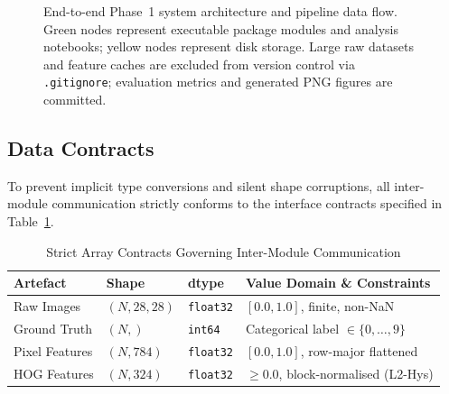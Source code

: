 \documentclass[conference]{IEEEtran}
\newcommand{\code}[1]{\texttt{#1}}
\newcommand{\file}[1]{\texttt{#1}}
\begin{document}
\begin{figure}[!t]
\caption{End-to-end Phase~1 system architecture and pipeline data flow.
Green nodes represent executable package modules and analysis notebooks;
yellow nodes represent disk storage. Large raw datasets and feature caches
are excluded from version control via \file{.gitignore}; evaluation metrics
and generated PNG figures are committed.}
\label{fig:arch}
\end{figure}

\subsection{Data Contracts}
To prevent implicit type conversions and silent shape corruptions, all
inter-module communication strictly conforms to the interface contracts
specified in Table~\ref{tab:contracts}.

\begin{table}[!t]
\centering
\caption{Strict Array Contracts Governing Inter-Module Communication}
\label{tab:contracts}
\footnotesize
\setlength{\tabcolsep}{4pt}
\begin{tabularx}{\columnwidth}{@{}lll>{\raggedright\arraybackslash}X@{}}
\toprule
Artefact & Shape & dtype & Value Domain \& Constraints\\
\midrule
Raw Images     & $(N, 28, 28)$ & \code{float32} & $[0.0, 1.0]$, finite, non-NaN\\
Ground Truth   & $(N,)$        & \code{int64}   & Categorical label $\in \{0,\dots,9\}$\\
Pixel Features & $(N, 784)$    & \code{float32} & $[0.0, 1.0]$, row-major flattened\\
HOG Features   & $(N, 324)$    & \code{float32} & $\ge 0.0$, block-normalised (L2-Hys)\\
\bottomrule
\end{tabularx}
\end{table}
\end{document}
